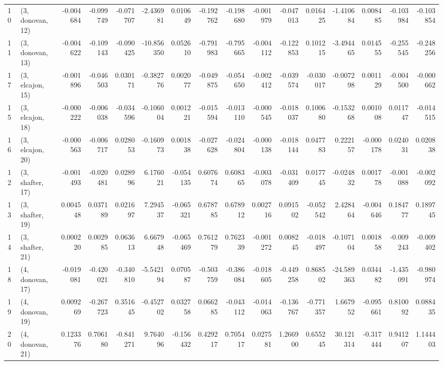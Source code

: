 \begin{tabular}{llrrrrrrrrrrrrrr}
10 &  (3, donovan, 12) &  -0.004684 & -0.099749 & -0.071707 &  -2.436981 &  0.010649 &  -0.192762 & -0.198680 & -0.001979 & -0.047013 &  0.016425 &  -1.410684 &  0.008485 & -0.103984 & -0.103854 \\
11 &  (3, donovan, 13) &  -0.004622 & -0.109143 & -0.090425 & -10.856350 &  0.052610 &  -0.791983 & -0.795665 & -0.004112 & -0.122853 &  0.101215 &  -3.494465 &  0.014555 & -0.255545 & -0.248256 \\
17 &  (3, elcajon, 15) &  -0.001896 & -0.046503 &  0.030171 &  -0.382776 &  0.002077 &  -0.049875 & -0.054650 & -0.002412 & -0.039574 & -0.030017 &  -0.007298 &  0.001129 & -0.004500 & -0.000662 \\
15 &  (3, elcajon, 18) &  -0.000222 & -0.006038 & -0.034596 &  -0.106004 &  0.001221 &  -0.015594 & -0.013110 & -0.000545 & -0.018037 &  0.100680 &  -0.153268 &  0.001008 &  0.011747 & -0.014515 \\
16 &  (3, elcajon, 20) &  -0.000563 & -0.006717 &  0.028053 &  -0.160973 &  0.001838 &  -0.027628 & -0.024804 & -0.000138 & -0.018144 &  0.047783 &   0.222157 & -0.000178 &  0.024031 &  0.020838 \\
12 &  (3, shafter, 17) &  -0.001493 & -0.020481 &  0.028996 &   6.176021 & -0.054135 &   0.607674 &  0.608365 & -0.003078 & -0.031409 &  0.017745 &  -0.024832 &  0.001778 & -0.001088 & -0.002092 \\
13 &  (3, shafter, 19) &   0.004548 &  0.037189 &  0.021697 &   7.294537 & -0.065321 &   0.678785 &  0.678912 &  0.002716 &  0.091502 & -0.052542 &   2.428464 & -0.004646 &  0.184777 &  0.189745 \\
14 &  (3, shafter, 21) &   0.000220 &  0.002985 &  0.063613 &   6.667948 & -0.065469 &   0.761279 &  0.762339 & -0.001272 &  0.008245 & -0.018497 &  -0.107104 &  0.001858 & -0.009243 & -0.009402 \\
18 &  (4, donovan, 17) &  -0.019081 & -0.420021 & -0.340810 &  -5.542194 &  0.070587 &  -0.503759 & -0.386084 & -0.018605 & -0.449258 &  0.868502 & -24.589363 &  0.034482 & -1.435091 & -0.980974 \\
19 &  (4, donovan, 19) &   0.009269 & -0.267723 &  0.351645 &  -0.452702 &  0.032758 &   0.066285 & -0.043112 & -0.014063 & -0.136767 & -0.771357 &   1.667952 & -0.095661 &  0.810092 &  0.088435 \\
20 &  (4, donovan, 21) &   0.123376 &  0.706180 & -0.841271 &   9.764096 & -0.156432 &   0.429217 &  0.705417 &  0.027581 &  1.266900 &  0.655245 &  30.121314 & -0.317444 &  0.941207 &  1.144403 \\

\end{tabular}
